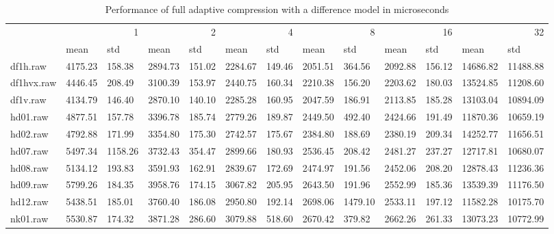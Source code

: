 \begin{table}
\caption{Performance of full adaptive compression with a difference model in microseconds}
\begin{tabular}{lllllllllllll}
 & \multicolumn{2}{r}{1} & \multicolumn{2}{r}{2} & \multicolumn{2}{r}{4} & \multicolumn{2}{r}{8} & \multicolumn{2}{r}{16} & \multicolumn{2}{r}{32} \\
 & mean & std & mean & std & mean & std & mean & std & mean & std & mean & std \\
df1h.raw & 4175.23 & 158.38 & 2894.73 & 151.02 & 2284.67 & 149.46 & 2051.51 & 364.56 & 2092.88 & 156.12 & 14686.82 & 11488.88 \\
df1hvx.raw & 4446.45 & 208.49 & 3100.39 & 153.97 & 2440.75 & 160.34 & 2210.38 & 156.20 & 2203.62 & 180.03 & 13524.85 & 11208.60 \\
df1v.raw & 4134.79 & 146.40 & 2870.10 & 140.10 & 2285.28 & 160.95 & 2047.59 & 186.91 & 2113.85 & 185.28 & 13103.04 & 10894.09 \\
hd01.raw & 4877.51 & 157.78 & 3396.78 & 185.74 & 2779.26 & 189.87 & 2449.50 & 492.40 & 2424.66 & 191.49 & 11870.36 & 10659.19 \\
hd02.raw & 4792.88 & 171.99 & 3354.80 & 175.30 & 2742.57 & 175.67 & 2384.80 & 188.69 & 2380.19 & 209.34 & 14252.77 & 11656.51 \\
hd07.raw & 5497.34 & 1158.26 & 3732.43 & 354.47 & 2899.66 & 180.93 & 2536.45 & 208.42 & 2481.27 & 237.27 & 12717.81 & 10680.07 \\
hd08.raw & 5134.12 & 193.83 & 3591.93 & 162.91 & 2839.67 & 172.69 & 2474.97 & 191.56 & 2452.06 & 208.20 & 12878.43 & 11236.36 \\
hd09.raw & 5799.26 & 184.35 & 3958.76 & 174.15 & 3067.82 & 205.95 & 2643.50 & 191.96 & 2552.99 & 185.36 & 13539.39 & 11176.50 \\
hd12.raw & 5438.51 & 185.01 & 3760.40 & 186.08 & 2950.80 & 192.14 & 2698.06 & 1479.10 & 2533.11 & 197.12 & 11582.28 & 10175.70 \\
nk01.raw & 5530.87 & 174.32 & 3871.28 & 286.60 & 3079.88 & 518.60 & 2670.42 & 379.82 & 2662.26 & 261.33 & 13073.23 & 10772.99 \\
\end{tabular}
\end{table}

